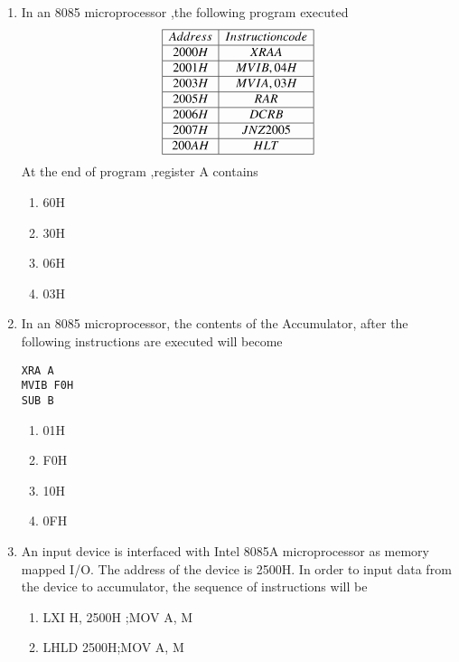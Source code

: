 \documentclass[journal,12pt,twocolumn]{IEEEtran}
\begin{document}
\begin{enumerate}
\begin{enumerate}
    \end{enumerate}
      \item In an 8085 microprocessor ,the following program executed \\
\begin{displaymath}
\begin{array}{|c|c|} \hline
Address & Instruction code  \\\hline
2000H & XRA A      \\\hline
2001H & MVIB,04H     \\\hline
2003H & MVI A,03H     \\\hline
2005H & RAR        \\\hline
2006H & DCR B        \\\hline
2007H & JNZ 2005        \\\hline
200AH & HLT        \\\hline
\end{array}
\end{displaymath}
At the end of program ,register A contains\\
      \begin{enumerate}
      \item 60H 
      \item 30H
      \item 06H
      \item 03H
    \end{enumerate}
    \item In an 8085 microprocessor, the contents of the Accumulator, after the following instructions are executed will become \\
\begin{verbatim}
XRA A 
MVIB F0H
SUB B
\end{verbatim}
     \begin{enumerate}
      \item 01H
      \item F0H
      \item 10H
      \item 0FH
    \end{enumerate}
    \item An input device is interfaced with Intel 8085A microprocessor as memory mapped I/O. The
address of the device is 2500H. In order to input data from the device to accumulator, the
sequence of instructions will be\\
    \begin{enumerate}
      \item LXI H, 2500H ;MOV A, M 
      \item LHLD 2500H;MOV A, M

\end{enumerate}
\end{enumerate}
\end{document}
